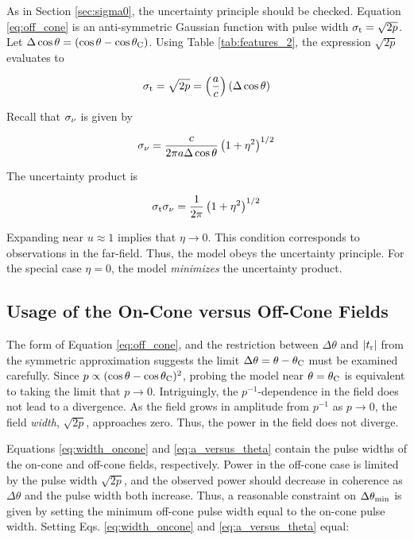 \documentclass[amsmath,amssymb,aps,prd,10pt,twocolumn]{revtex4}
\begin{document}
As in Section \ref{sec:sigma0}, the uncertainty principle should be checked.  Equation \ref{eq:off_cone} is an anti-symmetric Gaussian function with pulse width $\sigma_{\rm t} = \sqrt{2p}$.  Let $\Delta\cos\theta = (\cos\theta - \cos\theta_{\rm C})$.  Using Table \ref{tab:features_2}, the expression $\sqrt{2p}$ evaluates to

\begin{equation}
\sigma_{\rm t} = \sqrt{2p} = \left(\frac{a}{c}\right)(\Delta \cos\theta) \label{eq:a_versus_theta}
\end{equation}

Recall that $\sigma_{\rm \nu}$ is given by

\begin{equation}
\sigma_{\rm \nu} = \frac{c}{2\pi a \Delta\cos\theta}\left(1+\eta^2\right)^{1/2} \label{eq:sigmanu3}
\end{equation}

The uncertainty product is

\begin{equation}
\sigma_{\rm t} \sigma_{\rm \nu} = \frac{1}{2 \pi} \left(1+\eta^2\right)^{1/2} \label{eq:sigma_result}
\end{equation}

Expanding near $u \approx 1$ implies that $\eta \to 0$.  This condition corresponds to observations in the far-field.  Thus, the model obeys the uncertainty principle.  For the special case $\eta = 0$, the model \textit{minimizes} the uncertainty product.

\subsection{Usage of the On-Cone versus Off-Cone Fields}
\label{sec:usage}

The form of Equation \ref{eq:off_cone}, and the restriction between $\Delta\theta$ and $|t_{\rm r}|$ from the symmetric approximation suggests the limit $\Delta\theta = \theta-\theta_{\rm C}$ must be examined carefully.  Since $p \propto (\cos\theta - \cos\theta_{\rm C})^2$, probing the model near $\theta = \theta_{\rm C}$ is equivalent to taking the limit that $p \to 0$.  Intriguingly, the $p^{-1}$-dependence in the field does not lead to a divergence.  As the field grows in amplitude from $p^{-1}$ as $p \to 0$, the field \textit{width}, $\sqrt{2p}$, approaches zero.  Thus, the power in the field does not diverge.  

Equations \ref{eq:width_oncone} and \ref{eq:a_versus_theta} contain the pulse widths of the on-cone and off-cone fields, respectively.  Power in the off-cone case is limited by the pulse width $\sqrt{2p}$, and the observed power should decrease in coherence as $\Delta\theta$ and the pulse width both increase.  Thus, a reasonable constraint on $\Delta\theta_{\rm min}$ is given by setting the minimum off-cone pulse width equal to the on-cone pulse width.  Setting Eqs. \ref{eq:width_oncone} and \ref{eq:a_versus_theta} equal:
\end{document}
